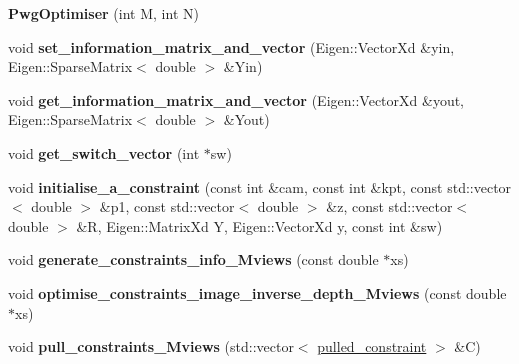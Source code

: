 \begin{DoxyCompactItemize}
\item 
{\bfseries Pwg\+Optimiser} (int M, int N)\hypertarget{classPwgOptimiser_ab082a4335ae1d71677b4098a3ca6e94b}{}\label{classPwgOptimiser_ab082a4335ae1d71677b4098a3ca6e94b}

\item 
void {\bfseries set\+\_\+information\+\_\+matrix\+\_\+and\+\_\+vector} (Eigen\+::\+Vector\+Xd \&yin, Eigen\+::\+Sparse\+Matrix$<$ double $>$ \&Yin)\hypertarget{classPwgOptimiser_a00fef5371d6840b4c3443ca7daf62672}{}\label{classPwgOptimiser_a00fef5371d6840b4c3443ca7daf62672}

\item 
void {\bfseries get\+\_\+information\+\_\+matrix\+\_\+and\+\_\+vector} (Eigen\+::\+Vector\+Xd \&yout, Eigen\+::\+Sparse\+Matrix$<$ double $>$ \&Yout)\hypertarget{classPwgOptimiser_a210b49d192ca7d98fadb2fa495d07212}{}\label{classPwgOptimiser_a210b49d192ca7d98fadb2fa495d07212}

\item 
void {\bfseries get\+\_\+switch\+\_\+vector} (int $\ast$sw)\hypertarget{classPwgOptimiser_a7bc7c631a1c763a5d1f8896641ca4928}{}\label{classPwgOptimiser_a7bc7c631a1c763a5d1f8896641ca4928}

\item 
void {\bfseries initialise\+\_\+a\+\_\+constraint} (const int \&cam, const int \&kpt, const std\+::vector$<$ double $>$ \&p1, const std\+::vector$<$ double $>$ \&z, const std\+::vector$<$ double $>$ \&R, Eigen\+::\+Matrix\+Xd Y, Eigen\+::\+Vector\+Xd y, const int \&sw)\hypertarget{classPwgOptimiser_a8d775b7dcc5930aa9a0f318e5d1753c2}{}\label{classPwgOptimiser_a8d775b7dcc5930aa9a0f318e5d1753c2}

\item 
void {\bfseries generate\+\_\+constraints\+\_\+info\+\_\+\+Mviews} (const double $\ast$xs)\hypertarget{classPwgOptimiser_aa7755f3adb3807a1a0c4f2aca738e71c}{}\label{classPwgOptimiser_aa7755f3adb3807a1a0c4f2aca738e71c}

\item 
void {\bfseries optimise\+\_\+constraints\+\_\+image\+\_\+inverse\+\_\+depth\+\_\+\+Mviews} (const double $\ast$xs)\hypertarget{classPwgOptimiser_acb4d7544d9e43b0fe51a7c9ec7f1ee1a}{}\label{classPwgOptimiser_acb4d7544d9e43b0fe51a7c9ec7f1ee1a}

\item 
void {\bfseries pull\+\_\+constraints\+\_\+\+Mviews} (std\+::vector$<$ \hyperlink{structPwgOptimiser_1_1pulled__constraint}{pulled\+\_\+constraint} $>$ \&C)\hypertarget{classPwgOptimiser_ac4df16773850e8c9d58a6f5c0a178197}{}\label{classPwgOptimiser_ac4df16773850e8c9d58a6f5c0a178197}

\end{DoxyCompactItemize}
